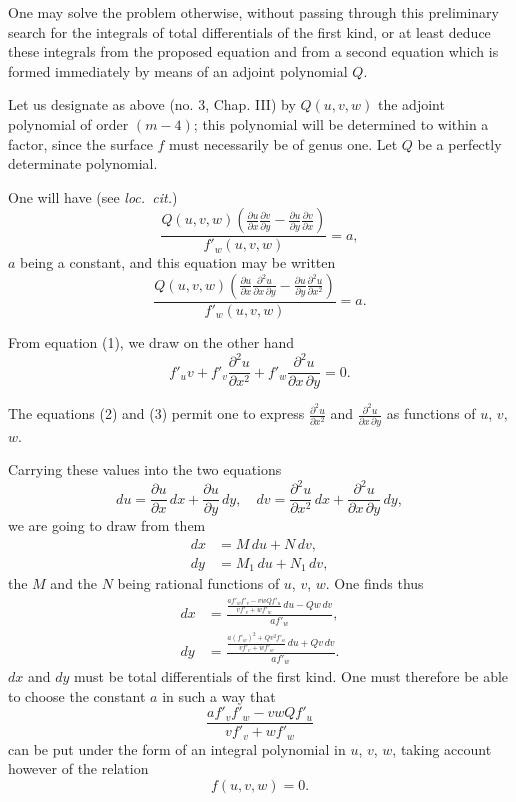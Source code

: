 \documentclass{article}
\begin{document}
One may solve the problem otherwise, without passing through this preliminary search for the integrals of total differentials of the first kind, or at least deduce these integrals from the proposed equation and from a second equation which is formed immediately by means of an adjoint polynomial $Q$.

Let us designate as above (no. 3, Chap. III) by $Q(u, v, w)$ the adjoint polynomial of order $(m - 4)$; this polynomial will be determined to within a factor, since the surface $f$ must necessarily be of genus one. Let $Q$ be a perfectly determinate polynomial.


One will have (see \emph{loc.\ cit.})
\[
\frac{Q(u, v, w)\left( \frac{\partial u}{\partial x} \frac{\partial v}{\partial y} - \frac{\partial u}{\partial y} \frac{\partial v}{\partial x} \right)}{f'_{w}(u, v, w)} = a,
\]
$a$ being a constant, and this equation may be written
\[
\frac{Q(u, v, w)\left( \frac{\partial u}{\partial x} \frac{\partial^{2} u}{\partial x\,\partial y} - \frac{\partial u}{\partial y} \frac{\partial^{2} u}{\partial x^{2}} \right)}{f'_{w}(u, v, w)} = a. \tag{2}
\]

From equation (1), we draw on the other hand
\[
f'_{u} v + f'_{v}\frac{\partial^{2} u}{\partial x^{2}} + f'_{w}\frac{\partial^{2} u}{\partial x\,\partial y} = 0. \tag{3}
\]

The equations (2) and (3) permit one to express $\frac{\partial^{2} u}{\partial x^{2}}$ and $\frac{\partial^{2} u}{\partial x\,\partial y}$ as functions of $u$, $v$, $w$.

Carrying these values into the two equations
\[
du = \frac{\partial u}{\partial x}\,dx + \frac{\partial u}{\partial y}\,dy, \quad dv = \frac{\partial^{2} u}{\partial x^{2}}\,dx + \frac{\partial^{2} u}{\partial x\,\partial y}\,dy,
\]
we are going to draw from them
\[
\begin{aligned}
dx &= M\,du + N\,dv, \\
dy &= M_{1}\,du + N_{1}\,dv,
\end{aligned}
\]
the $M$ and the $N$ being rational functions of $u$, $v$, $w$. One finds thus
\[
\begin{aligned}
dx &= \frac{\frac{a f'_{w} f'_{v} - v w Q f'_{u}}{v f'_{v} + w f'_{w}}\,du - Q w\,dv}{a f'_{w}}, \\
dy &= \frac{\frac{a (f'_{w})^{2} + Q v^{2} f'_{u}}{v f'_{v} + w f'_{w}}\,du + Q v\,dv}{a f'_{w}}.
\end{aligned}
\]
$dx$ and $dy$ must be total differentials of the first kind. One must therefore be able to choose the constant $a$ in such a way that
\[
\frac{a f'_{v} f'_{w} - v w Q f'_{u}}{v f'_{v} + w f'_{w}} \tag{4}
\]
can be put under the form of an integral polynomial in $u$, $v$, $w$, taking account however of the relation
\[
f(u, v, w) = 0.
\]
\end{document}
